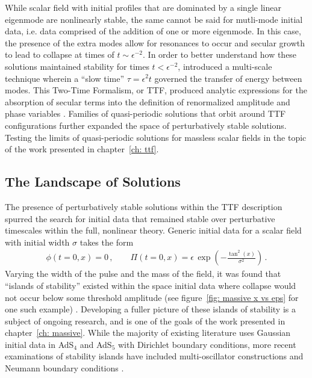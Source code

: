 \documentclass[../PhD.tex]{subfiles}
\begin{document}
While scalar field with initial profiles that are dominated by a single linear eigenmode are nonlinearly stable, the same cannot be said for mutli-mode initial data, i.e. data comprised of the addition of one or more eigenmode. In this case, the presence of the extra modes allow for resonances to occur and secular growth to lead to collapse at times of $t \sim \epsilon^{-2}$. In order to better understand how these solutions maintained stability for times $t < \epsilon^{-2}$, \cite{1403.6471} introduced a multi-scale technique wherein a ``slow time'' $\tau = \epsilon^2 t$ governed the transfer of energy between modes. This Two-Time Formalism, or TTF, produced analytic expressions for the absorption of secular terms into the definition of renormalized amplitude and phase variables \cite{1412.3249, 1412.4761,1510.07836}. Families of quasi-periodic solutions that orbit around TTF configurations further expanded the space of perturbatively stable solutions\cite{1410.2631, 1507.08261,  1706.07413, TTF}. Testing the limits of quasi-periodic solutions for massless scalar fields in the topic of the work presented in chapter~\ref{ch: ttf}.


\subsection{The Landscape of Solutions}
\label{ssec: scalar landscape}

The presence of perturbatively stable solutions within the TTF description spurred the search for initial data that remained stable over perturbative timescales within the full, nonlinear theory. Generic initial data for a scalar field with initial width $\sigma$ takes the form
\begin{align}
\label{scalar ics}
\phi(t=0, x) = 0 \, , \qquad \Pi(t=0, x) = \epsilon \, \exp \left( - \frac{ \tan^2 (x)}{\sigma^2} \right) \, .
\end{align}
Varying the width of the pulse and the mass of the field, it was found that ``islands of stability'' existed within the space initial data where collapse would not occur below some threshold amplitude (see figure~\ref{fig: massive x vs eps} for one such example) \cite{1508.02709, 1504.05203, 1711.00454, 1403.5434}. Developing a fuller picture of these islands of stability is a subject of ongoing research, and is one of the goals of the work presented in chapter~\ref{ch: massive}. While the majority of existing literature uses Gaussian initial data in AdS$_4$ and AdS$_5$ with Dirichlet boundary conditions, more recent examinations of stability islands have included multi-oscillator constructions and Neumann boundary conditions \cite{1803.02830, 1908.02296}.
\end{document}
